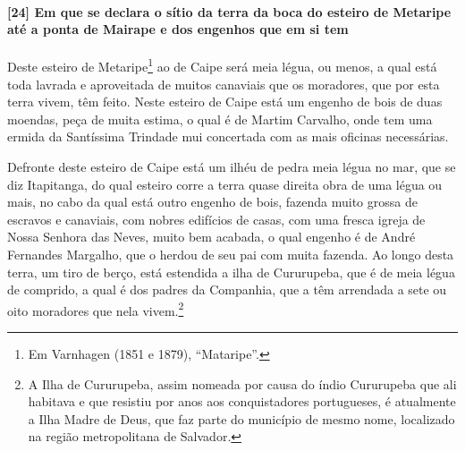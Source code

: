 \paragraph{[24] Em que se declara o sítio da terra da boca do esteiro de Metaripe até a
ponta de Mairape e dos engenhos que em si tem}\quad
Deste esteiro de Metaripe\footnote{ Em Varnhagen (1851 e 1879), ``Mataripe''.} ao de Caipe
será meia légua, ou menos, a qual está toda lavrada e aproveitada de muitos canaviais que
os moradores, que por esta terra vivem, têm feito. Neste esteiro de Caipe está um engenho
de bois de duas moendas, peça de muita estima, o qual é de Martim Carvalho, onde tem uma
ermida da Santíssima Trindade mui concertada com as mais oficinas necessárias.

Defronte deste esteiro de Caipe está um ilhéu de pedra meia légua no mar, que se diz
Itapitanga, do qual esteiro corre a terra quase direita obra de uma légua ou mais, no cabo
da qual está outro engenho de bois, fazenda muito grossa de escravos e canaviais, com
nobres edifícios de casas, com uma fresca igreja de Nossa Senhora das Neves, muito bem
acabada, o qual engenho é de André Fernandes Margalho, que o herdou de seu pai com muita
fazenda. Ao longo desta terra, um tiro de berço, está estendida a ilha de Cururupeba, que
é de meia légua de comprido, a qual é dos padres da Companhia, que a têm arrendada a sete
ou oito moradores que nela vivem.\footnote{ A Ilha de Cururupeba, assim nomeada por causa
do índio Cururupeba que ali habitava e que resistiu por anos aos conquistadores
portugueses, é atualmente a Ilha Madre de Deus, que faz parte do município de mesmo nome,
localizado na região metropolitana de Salvador.}

